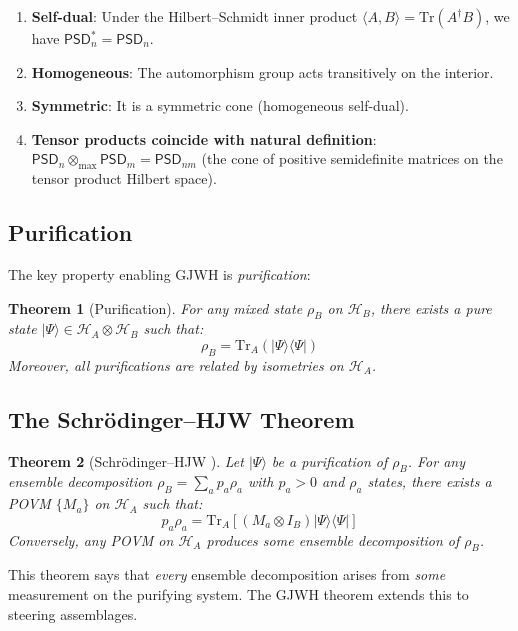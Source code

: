\documentclass[11pt,a4paper]{article}
\newtheorem{theorem}{Theorem}[section]
\theoremstyle{definition}
\newcommand{\tmax}{\otimes_{\max}}
\newcommand{\Hilb}{\mathcal{H}}
\newcommand{\PSD}{\mathsf{PSD}}
\newcommand{\Tr}{\mathrm{Tr}}
\begin{document}
\begin{enumerate}
    \item \textbf{Self-dual}: Under the Hilbert--Schmidt inner product $\langle A, B \rangle = \Tr(A^\dagger B)$, we have $\PSD_n^* = \PSD_n$.

    \item \textbf{Homogeneous}: The automorphism group acts transitively on the interior.

    \item \textbf{Symmetric}: It is a symmetric cone (homogeneous self-dual).

    \item \textbf{Tensor products coincide with natural definition}: $\PSD_n \tmax \PSD_m = \PSD_{nm}$ (the cone of positive semidefinite matrices on the tensor product Hilbert space).
\end{enumerate}

\subsection{Purification}

The key property enabling GJWH is \emph{purification}:

\begin{theorem}[Purification]
For any mixed state $\rho_B$ on $\Hilb_B$, there exists a pure state $|\Psi\rangle \in \Hilb_A \otimes \Hilb_B$ such that:
\[
\rho_B = \Tr_A(|\Psi\rangle\langle\Psi|)
\]
Moreover, all purifications are related by isometries on $\Hilb_A$.
\end{theorem}

\subsection{The Schr\"odinger--HJW Theorem}

\begin{theorem}[Schr\"odinger--HJW \cite{hughston1993complete}]
Let $|\Psi\rangle$ be a purification of $\rho_B$. For any ensemble decomposition $\rho_B = \sum_a p_a \rho_a$ with $p_a > 0$ and $\rho_a$ states, there exists a POVM $\{M_a\}$ on $\Hilb_A$ such that:
\[
p_a \rho_a = \Tr_A[(M_a \otimes I_B)|\Psi\rangle\langle\Psi|]
\]
Conversely, any POVM on $\Hilb_A$ produces some ensemble decomposition of $\rho_B$.
\end{theorem}

This theorem says that \emph{every} ensemble decomposition arises from \emph{some} measurement on the purifying system. The GJWH theorem extends this to steering assemblages.
\end{document}
